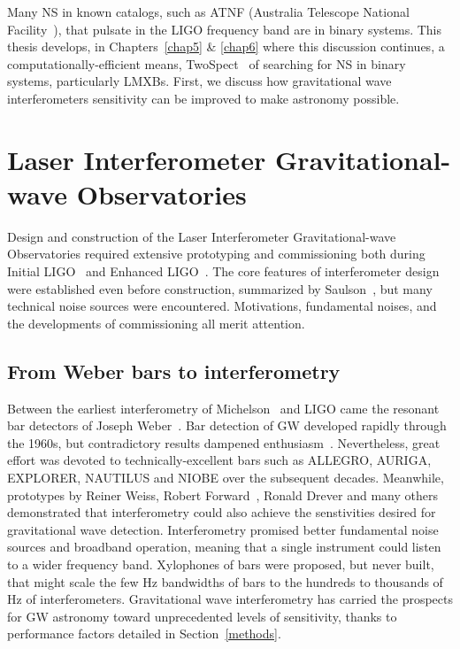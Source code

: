 Many NS in known catalogs, such as ATNF (Australia Telescope National Facility~\cite{ManchesterATNF2005}), that pulsate in the LIGO frequency band are in binary systems.
This thesis develops, in Chapters~\ref{chap5} \& \ref{chap6} where this discussion continues, a computationally-efficient means, TwoSpect~\cite{GoetzTwoSpectMethods2011} of searching for NS in binary systems, particularly LMXBs. 
First, we discuss how gravitational wave interferometers sensitivity can be improved to make astronomy possible.

    \section{Laser Interferometer Gravitational-wave Observatories}
    \label{LIGO}
        
Design and construction of the Laser Interferometer Gravitational-wave Observatories required extensive prototyping and commissioning both during Initial LIGO~\cite{MavalvalaThesis,AdhikariThesis,BallmerThesis} and Enhanced LIGO~\cite{FrickeThesis,SmithThesis,DooleyThesis}.
The core features of interferometer design were established even before construction, summarized by Saulson~\cite{Saulson}, but many technical noise sources were encountered.
Motivations, fundamental noises, and the developments of commissioning all merit attention.


        \subsection{From Weber bars to interferometry}
        \label{bars_to_interferometry}

Between the earliest interferometry of Michelson~\cite{michelson} and LIGO came the resonant bar detectors of Joseph Weber~\cite{Weber1960}.
Bar detection of GW developed rapidly through the 1960s, but contradictory results dampened enthusiasm~\cite{Saulson,CollinsGravityShadow}.
Nevertheless, great effort was devoted to technically-excellent bars such as ALLEGRO, AURIGA, EXPLORER, NAUTILUS and NIOBE over the subsequent decades.
Meanwhile, prototypes by Reiner Weiss, Robert Forward~\cite{Forward1978}, Ronald Drever and many others demonstrated that interferometry could also achieve the senstivities desired for gravitational wave detection.
Interferometry promised better fundamental noise sources and broadband operation, meaning that a single instrument could listen to a wider frequency band.
Xylophones of bars were proposed, but never built, that might scale the few Hz bandwidths of bars to the hundreds to thousands of Hz of interferometers.
Gravitational wave interferometry has carried the prospects for GW astronomy toward unprecedented levels of sensitivity, thanks to performance factors detailed in Section~\ref{methods}.

